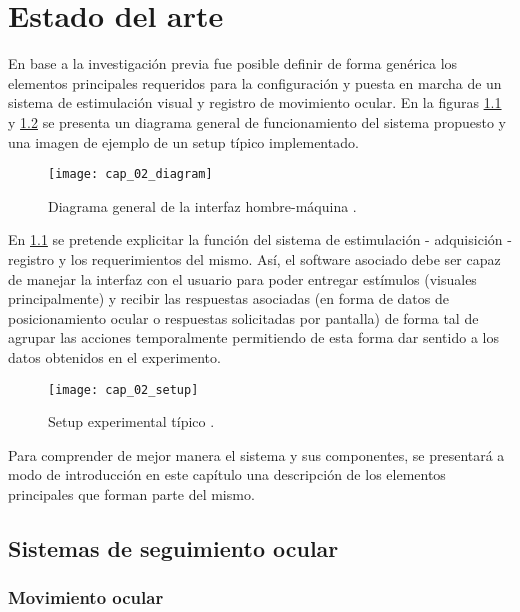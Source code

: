 \documentclass[../main.tex]{subfiles}
\begin{document}
		
\chapter{Estado del arte}
\label{cha:02_estado_del_arte}

	En base a la investigación previa fue posible definir de forma genérica los elementos principales requeridos para la configuración y puesta en marcha de un sistema de estimulación visual y registro de movimiento ocular. En la figuras \ref{fig:02_diagrama_interfaz} y \ref{fig:02_ejemplo_setup} se presenta un diagrama general de funcionamiento del sistema propuesto y una imagen de ejemplo de un \gls{setup} típico implementado.   

	\begin{figure}[H]
		\centering
		\texttt{[image: cap\_02\_diagram]}
		\caption{Diagrama general de la interfaz hombre-máquina \cite{website:baseInfo}.}
		\label{fig:02_diagrama_interfaz}
	\end{figure}

	En \ref{fig:02_diagrama_interfaz} se pretende explicitar la función del sistema de estimulación - adquisición - registro y los requerimientos del mismo. Así, el software asociado debe ser capaz de manejar la interfaz con el usuario para poder entregar estímulos (visuales principalmente) y recibir las respuestas asociadas (en forma de datos de posicionamiento ocular o respuestas solicitadas por pantalla) de forma tal de agrupar las acciones temporalmente permitiendo de esta forma dar sentido a los datos obtenidos en el experimento. 

	\newpage
	\begin{figure}[H]
		\centering
		\texttt{[image: cap\_02\_setup]}
		\caption{Setup experimental típico \cite{website:baseInfo}.}
		\label{fig:02_ejemplo_setup}
	\end{figure}

	Para comprender de mejor manera el sistema y sus componentes, se presentará a modo de introducción en este capítulo una descripción de los elementos principales que forman parte del mismo. 

	\section{Sistemas de seguimiento ocular}
	\label{sec:02_sistemas_de_seguimiento_ocular}
		\subsection{Movimiento ocular}
		\label{sub:02_movimiento_ocular}
\end{document}

